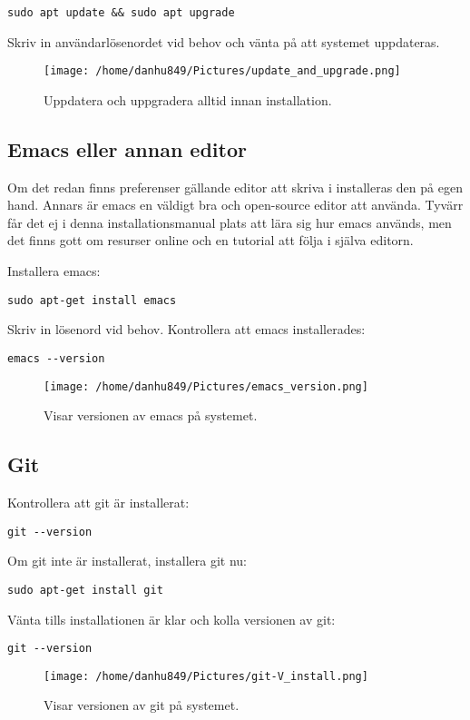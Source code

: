 \documentclass{TDP003mall}
\begin{document}
\texttt{sudo apt update \&\& sudo apt upgrade}

Skriv in användarlösenordet vid behov och vänta på att systemet uppdateras.

\begin{figure}[h]
  \centerline{\texttt{[image: /home/danhu849/Pictures/update\_and\_upgrade.png]}}
  \caption{Uppdatera och uppgradera alltid innan installation.}
  \label{fig}
\end{figure}

\subsection{Emacs eller annan editor}
Om det redan finns preferenser gällande editor att skriva i installeras den på egen hand. Annars är emacs en väldigt bra och open-source editor att använda. Tyvärr får det ej i denna installationsmanual plats att lära sig hur emacs används, men det finns gott om resurser online och en tutorial att följa i själva editorn.

Installera emacs:

\texttt{sudo apt-get install emacs}

Skriv in lösenord vid behov. Kontrollera att emacs installerades:

\texttt{emacs \texttt{-{}-}version}

\begin{figure}[h]
  \centerline{\texttt{[image: /home/danhu849/Pictures/emacs\_version.png]}}
  \caption{Visar versionen av emacs på systemet.}
  \label{fig}
\end{figure}

\subsection{Git}
Kontrollera att git är installerat:

\texttt{git \texttt{-{}-}version}

Om git inte är installerat, installera git nu:

\texttt{sudo apt-get install git}

Vänta tills installationen är klar och kolla versionen av git:

\texttt{git \texttt{-{}-}version}

\begin{figure}[h]
  \centerline{\texttt{[image: /home/danhu849/Pictures/git-V\_install.png]}}
  \caption{Visar versionen av git på systemet.}
  \label{fig}
\end{figure}
\end{document}
